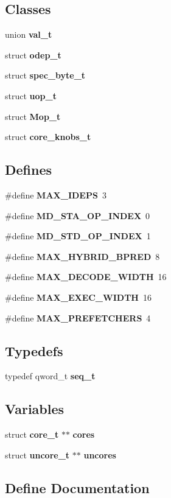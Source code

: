 \subsection*{Classes}
\begin{CompactItemize}
\item 
union {\bf val\_\-t}
\item 
struct {\bf odep\_\-t}
\item 
struct {\bf spec\_\-byte\_\-t}
\item 
struct {\bf uop\_\-t}
\item 
struct {\bf Mop\_\-t}
\item 
struct {\bf core\_\-knobs\_\-t}
\end{CompactItemize}
\subsection*{Defines}
\begin{CompactItemize}
\item 
\#define {\bf MAX\_\-IDEPS}~3
\item 
\#define {\bf MD\_\-STA\_\-OP\_\-INDEX}~0
\item 
\#define {\bf MD\_\-STD\_\-OP\_\-INDEX}~1
\item 
\#define {\bf MAX\_\-HYBRID\_\-BPRED}~8
\item 
\#define {\bf MAX\_\-DECODE\_\-WIDTH}~16
\item 
\#define {\bf MAX\_\-EXEC\_\-WIDTH}~16
\item 
\#define {\bf MAX\_\-PREFETCHERS}~4
\end{CompactItemize}
\subsection*{Typedefs}
\begin{CompactItemize}
\item 
typedef qword\_\-t {\bf seq\_\-t}
\end{CompactItemize}
\subsection*{Variables}
\begin{CompactItemize}
\item 
struct {\bf core\_\-t} $\ast$$\ast$ {\bf cores}
\item 
struct {\bf uncore\_\-t} $\ast$$\ast$ {\bf uncores}
\end{CompactItemize}


\subsection{Define Documentation}
